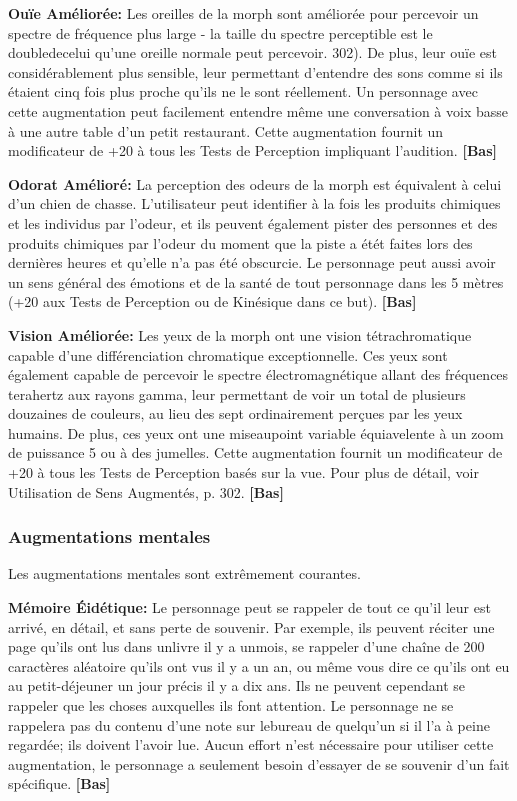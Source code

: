 \textbf{Ouïe Améliorée:} Les oreilles de la morph sont améliorée pour percevoir un spectre de fréquence plus large - la taille du spectre perceptible est le doubledecelui qu'une oreille normale peut percevoir. 302). De plus, leur ouïe est considérablement plus sensible, leur permettant d'entendre des sons comme si ils étaient cinq fois plus proche qu'ils ne le sont réellement. Un personnage avec cette augmentation peut facilement entendre même une conversation à voix basse à une autre table d'un petit restaurant. Cette augmentation fournit un modificateur de +20 à tous les Tests de Perception impliquant l'audition. \textbf{[Bas]} 

\textbf{Odorat Amélioré:} La perception des odeurs de la morph est équivalent à celui d'un chien de chasse. L'utilisateur peut identifier à la fois les produits chimiques et les individus par l'odeur, et ils peuvent également pister des personnes et des produits chimiques par l'odeur du moment que la piste a étét faites lors des dernières heures et qu'elle n'a pas été obscurcie. Le personnage peut aussi avoir un sens général des émotions et de la santé de tout personnage dans les 5 mètres (+20 aux Tests de Perception ou de Kinésique dans ce but). \textbf{[Bas]} 

\textbf{Vision Améliorée:} Les yeux de la morph ont une vision tétrachromatique capable d'une différenciation chromatique exceptionnelle. Ces yeux sont également capable de percevoir le spectre électromagnétique allant des fréquences terahertz aux rayons gamma, leur permettant de voir un total de plusieurs douzaines de couleurs, au lieu des sept ordinairement perçues par les yeux humains. De plus, ces yeux ont une miseaupoint variable équiavelente à un zoom de puissance 5 ou à des jumelles. Cette augmentation fournit un modificateur de +20 à tous les Tests de Perception basés sur la vue. Pour plus de détail, voir Utilisation de Sens Augmentés, p. 302. \textbf{[Bas]} 

\subsubsection{Augmentations mentales} 

Les augmentations mentales sont extrêmement courantes. 

\textbf{Mémoire Éidétique:} Le personnage peut se rappeler de tout ce qu'il leur est arrivé, en détail, et sans perte de souvenir. Par exemple, ils peuvent réciter une page qu'ils ont lus dans unlivre il y a unmois, se rappeler d'une chaîne de 200 caractères aléatoire qu'ils ont vus il y a un an, ou même vous dire ce qu'ils ont eu au petit-déjeuner un jour précis il y a dix ans. Ils ne peuvent cependant se rappeler que les choses auxquelles ils font attention. Le personnage ne se rappelera pas du contenu d'une note sur lebureau de quelqu'un si il l'a à peine regardée; ils doivent l'avoir lue. Aucun effort n'est nécessaire pour utiliser cette augmentation, le personnage a seulement besoin d'essayer de se souvenir d'un fait spécifique. \textbf{[Bas]} 

